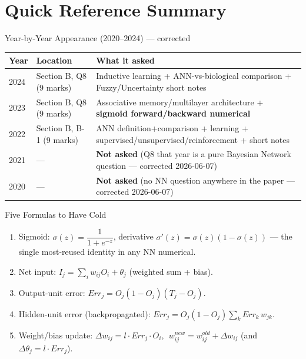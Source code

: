 \documentclass[12pt,a4paper]{article}
\begin{document}
\newpage
\section*{Quick Reference Summary}

\begin{keybox}{Year-by-Year Appearance (2020--2024) --- corrected}
\begin{tabular}{lll}
\toprule
\textbf{Year} & \textbf{Location} & \textbf{What it asked} \\
\midrule
2024 & Section B, Q8 (9 marks) & Inductive learning + ANN-vs-biological comparison + Fuzzy/Uncertainty short notes \\
2023 & Section B, Q8 (9 marks) & Associative memory/multilayer architecture + \textbf{sigmoid forward/backward numerical} \\
2022 & Section B, B-1 (9 marks) & ANN definition+comparison + learning + supervised/unsupervised/reinforcement + short notes \\
2021 & --- & \textbf{Not asked} (Q8 that year is a pure Bayesian Network question --- corrected 2026-06-07) \\
2020 & --- & \textbf{Not asked} (no NN question anywhere in the paper --- corrected 2026-06-07) \\
\bottomrule
\end{tabular}
\end{keybox}

\begin{keybox}{Five Formulas to Have Cold}
\begin{enumerate}[noitemsep]
  \item Sigmoid: $\sigma(z) = \dfrac{1}{1+e^{-z}}$, derivative $\sigma'(z) = \sigma(z)(1-\sigma(z))$ --- the single most-reused identity in any NN numerical.
  \item Net input: $I_j = \sum_i w_{ij}O_i + \theta_j$ (weighted sum + bias).
  \item Output-unit error: $Err_j = O_j(1-O_j)(T_j - O_j)$.
  \item Hidden-unit error (backpropagated): $Err_j = O_j(1-O_j)\sum_k Err_k\, w_{jk}$.
  \item Weight/bias update: $\Delta w_{ij} = l \cdot Err_j \cdot O_i$, $\;w_{ij}^{new} = w_{ij}^{old} + \Delta w_{ij}$ (and $\Delta\theta_j = l \cdot Err_j$).
\end{enumerate}
\end{keybox}
\end{document}
